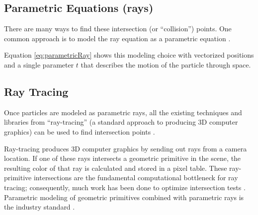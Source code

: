 	\subsection{Parametric Equations (rays)}

There are many ways to find these intersection (or ``collision'') points. One common approach is to model the ray equation as a parametric equation \cite{glassner1989introduction} \cite{fundamentals}.


 {
	\label{eq:parametricRay}
}

Equation \eqref{eq:parametricRay} shows this modeling choice with vectorized positions and a single parameter $t$ that describes the motion of the particle through space.


	\subsection{Ray Tracing}

Once particles are modeled as parametric rays, all the existing techniques and libraries from ``ray-tracing'' (a standard approach to producing 3D computer graphics) can be used to find intersection points \cite{glassner1989introduction} \cite{fundamentals}.

Ray-tracing produces 3D computer graphics by sending out rays from a camera location. If one of these rays intersects a geometric primitive in the scene, the resulting color of that ray is calculated and stored in a pixel table. These ray-primitive intersections are the fundamental computational bottleneck for ray tracing; consequently, much work has been done to optimize intersection tests \cite{glassner1989introduction} \cite{fundamentals}. Parametric modeling of geometric primitives combined with parametric rays is the industry standard \cite{glassner1989introduction} \cite{fundamentals}.



